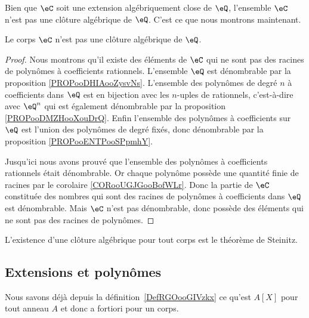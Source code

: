 Bien que \( \eC\) soit une extension algébriquement close de \( \eQ\), l'ensemble \( \eC\) n'est pas une clôture algébrique de \( \eQ\). C'est ce que nous montrons maintenant.
\begin{lemma}       \label{LEMooRDIZooRjWNMa}
    Le corps \( \eC\) n'est pas une clôture algébrique de \( \eQ\).    
\end{lemma}

\begin{proof}
    Nous montrons qu'il existe des éléments de \( \eC\) qui ne sont pas des racines de polynômes à coefficients rationnels. L'ensemble \( \eQ\) est dénombrable par la proposition \ref{PROPooDHIAooZysvNs}. L'ensemble des polynômes de degré \( n\) à coefficients dans \( \eQ\) est en bijection avec les \( n\)-uples de rationnels, c'est-à-dire avec \( \eQ^n\) qui est également dénombrable par la proposition \ref{PROPooDMZHooXouDrQ}. Enfin l'ensemble des polynômes à coefficients sur \( \eQ\) est l'union des polynômes de degré fixés, donc dénombrable par la proposition \ref{PROPooENTPooSPpmhY}.

    Jusqu'ici nous avons prouvé que l'ensemble des polynômes à coefficients rationnels était dénombrable. Or chaque polynôme possède une quantité finie de racines par le corolaire \ref{CORooUGJGooBofWLr}. Donc la partie de \( \eC\) constituée des nombres qui sont des racines de polynômes à coefficients dans \( \eQ\) est dénombrable. Mais \( \eC\) n'est pas dénombrable, donc possède des éléments qui ne sont pas des racines de polynômes.
\end{proof}

L'existence d'une clôture algébrique pour tout corps est le théorème de Steinitz.


\subsection{Extensions et polynômes}

Nous savons déjà depuis la définition~\ref{DefRGOooGIVzkx} ce qu'est \( A[X]\) pour tout anneau \( A\) et donc a fortiori pour un corps.

